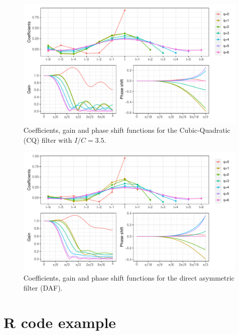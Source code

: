 \documentclass[
]{article}
\newcommand\1{\mathds{1}}
\begin{document}
\begin{figure}[H]

\caption{\label{fig-graphs-coef-cq}Coefficients, gain and phase shift
functions for the Cubic-Quadratic (CQ) filter with \(I/C=3.5\).}

{\centering \includegraphics[width=1\textwidth,height=\textheight]{img/filters_used/cq.pdf}

}

\end{figure}

\begin{figure}[H]

\caption{\label{fig-graphs-coef-daf}Coefficients, gain and phase shift
functions for the direct asymmetric filter (DAF).}

{\centering \includegraphics[width=1\textwidth,height=\textheight]{img/filters_used/daf.pdf}

}

\end{figure}

\hypertarget{ann-ex-r}{%
\section{R code example}\label{ann-ex-r}}
\end{document}
